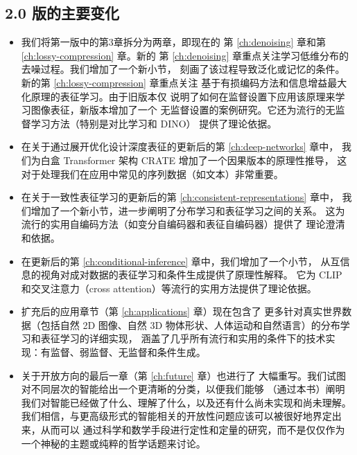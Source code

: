 \documentclass[../../book-main.tex]{subfiles}
\begin{document}
\subsection*{2.0 版的主要变化}
\begin{itemize}
    \item 我们将第一版中的第3章拆分为两章，即现在的
        第 \ref{ch:denoising} 章和第 \ref{ch:lossy-compression} 章。新的
        第 \ref{ch:denoising} 章重点关注学习低维分布的去噪过程。我们增加了一个新小节，
        刻画了该过程导致泛化或记忆的条件。新的第 \ref{ch:lossy-compression} 章重点关注
        基于有损编码方法和信息增益最大化原理的表征学习。由于旧版本仅
        说明了如何在监督设置下应用该原理来学习图像表征，新版本增加了一个
        无监督设置的案例研究。它还为流行的无监督学习方法（特别是对比学习和 DINO）
        提供了理论依据。
    \item 在关于通过展开优化设计深度表征的更新后的第 \ref{ch:deep-networks} 章中，
    我们为白盒 Transformer 架构 CRATE 增加了一个因果版本的原理性推导，
    这对于处理我们在应用中常见的序列数据（如文本）非常重要。
    \item 在关于一致性表征学习的更新后的第 \ref{ch:consistent-representations} 章中，
        我们增加了一个新小节，进一步阐明了分布学习和表征学习之间的关系。
        这为流行的实用自编码方法（如变分自编码器和表征自编码器）提供了
        理论澄清和依据。
    \item 在更新后的第 \ref{ch:conditional-inference} 章中，我们增加了一个小节，
        从互信息的视角对成对数据的表征学习和条件生成提供了原理性解释。
        它为 CLIP 和交叉注意力（cross attention）等流行的实用方法提供了理论依据。
    \item 扩充后的应用章节（第 \ref{ch:applications} 章）现在包含了
        更多针对真实世界数据（包括自然 2D 图像、自然 3D 物体形状、人体运动和自然语言）的分布学习和表征学习的详细实现，
        涵盖了几乎所有流行和实用的条件下的技术实现：有监督、弱监督、无监督和条件生成。 
    \item 关于开放方向的最后一章（第 \ref{ch:future} 章）也进行了
        大幅重写。我们试图对不同层次的智能给出一个更清晰的分类，以便我们能够
        （通过本书）阐明我们对智能已经做了什么、理解了什么，以及还有什么尚未实现和尚未理解。
        我们相信，与更高级形式的智能相关的开放性问题应该可以被很好地界定出来，从而可以
        通过科学和数学手段进行定性和定量的研究，而不是仅仅作为一个神秘的主题或纯粹的哲学话题来讨论。
\end{itemize}
\end{document}
